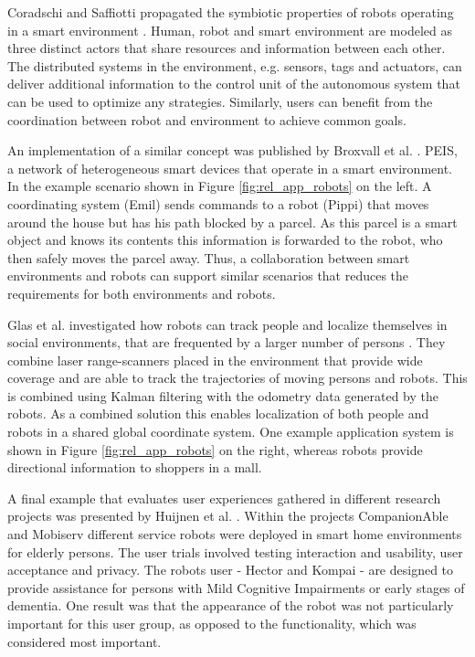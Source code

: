 Coradschi and Saffiotti propagated the symbiotic properties of robots operating in a smart environment \cite{coradeschi2006symbiotic}. Human, robot and smart environment are modeled as three distinct actors that share resources and information between each other. The distributed systems in the environment, e.g. sensors, tags and actuators, can deliver additional information to the control unit of the autonomous system that can be used to optimize any strategies. Similarly, users can benefit from the coordination between robot and environment to achieve common goals.

An implementation of a similar concept was published by Broxvall et al. \cite{broxvall2006peis}. PEIS, a network of heterogeneous smart devices that operate in a smart environment. In the example scenario shown in Figure \ref{fig:rel_app_robots} on the left. A coordinating system (Emil) sends commands to a robot (Pippi) that moves around the house but has his path blocked by a parcel. As this parcel is a smart object and knows its contents this information is forwarded to the robot, who then safely moves the parcel away. Thus, a collaboration between smart environments and robots can support similar scenarios that reduces the requirements for both environments and robots.

Glas et al. investigated how robots can track people and localize themselves in social environments, that are frequented by a larger number of persons \cite{glas2009simultaneous}. They combine laser range-scanners placed in the environment that provide wide coverage and are able to track the trajectories of moving persons and robots. This is combined using Kalman filtering with the odometry data generated by the robots. As a combined solution this enables localization of both people and robots in a shared global coordinate system. One example application system is shown in Figure \ref{fig:rel_app_robots} on the right, whereas robots provide directional information to shoppers in a mall.

A final example that evaluates user experiences gathered in different research projects was presented by Huijnen et al.  \cite{huijnen2011maybe}. Within the projects CompanionAble and Mobiserv different service robots were deployed in smart home environments for elderly persons. The user trials involved testing interaction and usability, user acceptance and privacy. The robots user - Hector and Kompai - are designed to provide assistance for persons with Mild Cognitive Impairments or early stages of dementia. One result was that the appearance of the robot was not particularly important for this user group, as opposed to the functionality, which was considered most important. 
